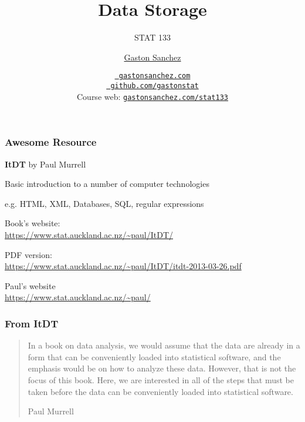 \documentclass[12pt]{beamer}\usepackage[]{graphicx}\usepackage[]{color}
\title{Data Storage}
\subtitle{STAT 133}
\author{\href{http://www.gastonsanchez.com}{Gaston Sanchez}}
\institute{Department of Statistics, UC{\textendash}Berkeley}
\date{\href{http://www.gastonsanchez.com}{\tt \scriptsize \color{foreground} gastonsanchez.com}
\\[-4pt]
\href{http://github.com/gastonstat}{\tt \scriptsize \color{foreground} github.com/gastonstat}
\\[-4pt]
{\scriptsize Course web: \href{http://www.gastonsanchez.com/stat133}{\tt gastonsanchez.com/stat133}}
}
\begin{document}
{
  \frame{
    \titlepage
  } 
}


\begin{frame}
\begin{center}
\Huge{}
\end{center}
\end{frame}


\begin{frame}
\frametitle{Awesome Resource}

\bi
  \item \textbf{ItDT} by Paul Murrell
  \item Basic introduction to a number of computer technologies
  \item e.g. HTML, XML, Databases, SQL, regular expressions
  \item Book's website: \\
  \url{https://www.stat.auckland.ac.nz/~paul/ItDT/}
  \item PDF version: \\
  {\scriptsize \url{https://www.stat.auckland.ac.nz/~paul/ItDT/itdt-2013-03-26.pdf}}
  \item Paul's website \\
  \url{https://www.stat.auckland.ac.nz/~paul/}  
\ei
\eb

\end{frame}


\begin{frame}[fragile]
\frametitle{From ItDT}

\begin{quotation}
In a book on data analysis, we would assume that the data are already in a form that can be conveniently loaded into statistical software, and the emphasis would be on how to analyze these data. However, that is not the focus of this book. Here, we are interested in all of the steps that must be taken before the data can be conveniently loaded into statistical software.

\bigskip
{\footnotesize Paul Murrell}
\end{quotation}

\end{frame}
\end{document}
